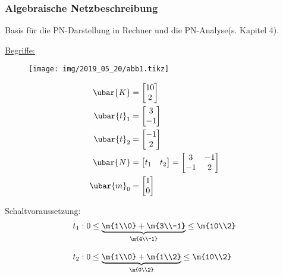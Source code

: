 \subsubsection{Algebraische Netzbeschreibung}
Basis für die PN-Darstellung in Rechner und die PN-Analyse(s. Kapitel 4).

\underline{Begriffe:} 


\begin{figure}[H]
	\centering
	\texttt{[image: img/2019\_05\_20/abb1.tikz]}
\end{figure}

\begin{subequations}
	\begin{align}
	\ubar{K}   &= \begin{bmatrix}10\\2\end{bmatrix} \\
	\ubar{t}_1 &= \begin{bmatrix}3\\-1\end{bmatrix}\\
	\ubar{t}_2 &= \begin{bmatrix}-1\\2\end{bmatrix}\\
	\ubar{N}   &= \begin{bmatrix}t_1 & t_2\end{bmatrix} = \begin{bmatrix}3 & -1 \\ -1 & 2\end{bmatrix}\\
	\ubar{m}_0 &= \begin{bmatrix}1 \\ 0\end{bmatrix}
	\end{align}
\end{subequations}

Schaltvoraussetzung:
\begin{subequations}
	\begin{align}
	t_1 &: 0 \le \underbrace{\m{1\\0}+\m{3\\-1}}_{\m{4\\-1}} \le \m{10\\2}\\[2ex]
	t_2 &: 0 \le \underbrace{\m{1\\0}+\m{1\\2}}_{\m{0\\2}} \le \m{10\\2}
	\end{align}
\end{subequations}

